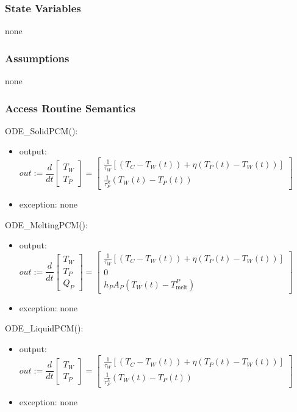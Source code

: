 \documentclass[12pt]{article}
\begin{document}
\subsubsection{State Variables}

none

\subsubsection{Assumptions}

none

\subsubsection{Access Routine Semantics}

ODE\_SolidPCM(): 
\renewcommand*{\arraystretch}{1.5}
\begin{itemize}
\item output: $out := 
\dfrac{d}{dt} \left [ 
\begin{array}{c}
T_W\\
T_P 
\end{array} 
\right] =
\left [ 
\begin{array}{c}
\frac{1}{\tau_W}[(T_C - T_W(t)) + {\eta}(T_P(t) - T_W(t))]\\
\frac{1}{\tau^S_P}(T_W(t) - T_P(t)) 
\end{array} 
\right]
$
\item exception: none
\end{itemize}

ODE\_MeltingPCM(): 
\renewcommand*{\arraystretch}{1.5}
\begin{itemize}
\item output: $out := 
\dfrac{d}{dt} \left [ 
\begin{array}{c}
T_W\\
T_P\\
Q_P 
\end{array} 
\right] =
\left [ 
\begin{array}{c}
\frac{1}{\tau_W}[(T_C - T_W(t)) + {\eta}(T_P(t) - T_W(t))]\\
0 \\
h_P A_P (T_W(t) - T_\text{melt}^P)
\end{array} 
\right]
$
\item exception: none
\end{itemize}

ODE\_LiquidPCM(): 
\renewcommand*{\arraystretch}{1.5}
\begin{itemize}
\item output: $out := 
\dfrac{d}{dt} \left [ 
\begin{array}{c}
T_W\\
T_P
\end{array} 
\right] =
\left [ 
\begin{array}{c}
\frac{1}{\tau_W}[(T_C - T_W(t)) + {\eta}(T_P(t) - T_W(t))]\\
\frac{1}{\tau^L_P}(T_W(t) - T_P(t))
\end{array} 
\right]
$
\item exception: none
\end{itemize}
\end{document}
